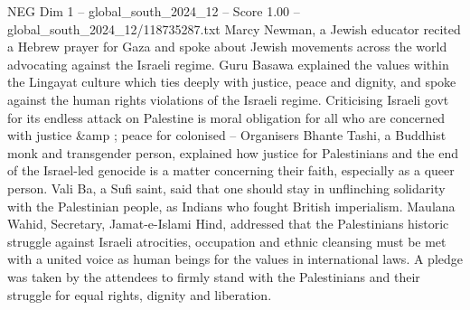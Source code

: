 \begin{textsample}{NEG Dim 1 – global\_south\_2024\_12 – Score 1.00 – global\_south\_2024\_12/118735287.txt}
Marcy Newman, a Jewish educator recited a Hebrew prayer for Gaza and spoke about Jewish movements across the world advocating against the Israeli regime.
Guru Basawa explained the values within the Lingayat culture which ties deeply with justice, peace and dignity, and spoke against the human rights violations of the Israeli regime.
Criticising Israeli govt for its endless attack on Palestine is moral obligation for all who are concerned with justice \&amp ; peace for colonised -- Organisers Bhante Tashi, a Buddhist monk and transgender person, explained how justice for Palestinians and the end of the Israel-led genocide is a matter concerning their faith, especially as a queer person.
Vali Ba, a Sufi saint, said that one should stay in unflinching solidarity with the Palestinian people, as Indians who fought British imperialism.
Maulana Wahid, Secretary, Jamat-e-Islami Hind, addressed that the Palestinians historic struggle against Israeli atrocities, occupation and ethnic cleansing must be met with a united voice as human beings for the values in international laws.
A pledge was taken by the attendees to firmly stand with the Palestinians and their struggle for equal rights, dignity and liberation.

\end{textsample}

